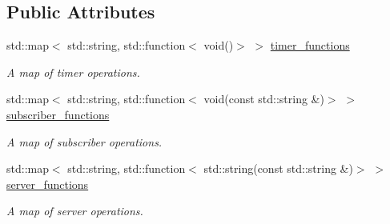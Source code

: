 \subsection*{Public Attributes}
\begin{DoxyCompactItemize}
\item 
std\+::map$<$ std\+::string, std\+::function$<$ void()$>$ $>$ \hyperlink{classzcm_1_1Component_a9769fc36758ee1f5a667ed23b814dc4b}{timer\+\_\+functions}
\begin{DoxyCompactList}\small\item\em A map of timer operations. \end{DoxyCompactList}\item 
std\+::map$<$ std\+::string, std\+::function$<$ void(const std\+::string \&)$>$ $>$ \hyperlink{classzcm_1_1Component_a1895703be210f0bd6558360575695147}{subscriber\+\_\+functions}
\begin{DoxyCompactList}\small\item\em A map of subscriber operations. \end{DoxyCompactList}\item 
std\+::map$<$ std\+::string, std\+::function$<$ std\+::string(const std\+::string \&)$>$ $>$ \hyperlink{classzcm_1_1Component_abae0d67e53de7447a2ade59f3ae40295}{server\+\_\+functions}
\begin{DoxyCompactList}\small\item\em A map of server operations. \end{DoxyCompactList}\end{DoxyCompactItemize}
